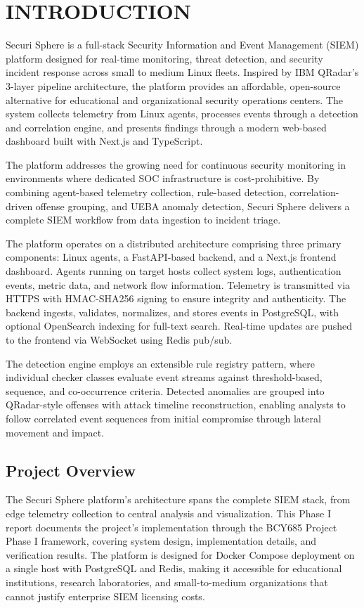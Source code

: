 \chapter{INTRODUCTION}

Securi Sphere is a full-stack Security Information and Event Management (SIEM) platform designed for real-time monitoring, threat detection, and security incident response across small to medium Linux fleets. Inspired by IBM QRadar's 3-layer pipeline architecture, the platform provides an affordable, open-source alternative for educational and organizational security operations centers. The system collects telemetry from Linux agents, processes events through a detection and correlation engine, and presents findings through a modern web-based dashboard built with Next.js and TypeScript.

The platform addresses the growing need for continuous security monitoring in environments where dedicated SOC infrastructure is cost-prohibitive. By combining agent-based telemetry collection, rule-based detection, correlation-driven offense grouping, and UEBA anomaly detection, Securi Sphere delivers a complete SIEM workflow from data ingestion to incident triage.

The platform operates on a distributed architecture comprising three primary components: Linux agents, a FastAPI-based backend, and a Next.js frontend dashboard. Agents running on target hosts collect system logs, authentication events, metric data, and network flow information. Telemetry is transmitted via HTTPS with HMAC-SHA256 signing to ensure integrity and authenticity. The backend ingests, validates, normalizes, and stores events in PostgreSQL, with optional OpenSearch indexing for full-text search. Real-time updates are pushed to the frontend via WebSocket using Redis pub/sub.

The detection engine employs an extensible rule registry pattern, where individual checker classes evaluate event streams against threshold-based, sequence, and co-occurrence criteria. Detected anomalies are grouped into QRadar-style offenses with attack timeline reconstruction, enabling analysts to follow correlated event sequences from initial compromise through lateral movement and impact.

\section{Project Overview}

The Securi Sphere platform's architecture spans the complete SIEM stack, from edge telemetry collection to central analysis and visualization. This Phase I report documents the project's implementation through the BCY685 Project Phase I framework, covering system design, implementation details, and verification results. The platform is designed for Docker Compose deployment on a single host with PostgreSQL and Redis, making it accessible for educational institutions, research laboratories, and small-to-medium organizations that cannot justify enterprise SIEM licensing costs.

